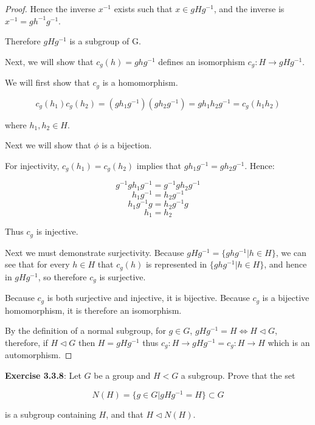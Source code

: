 \documentclass[a4paper]{article}
\begin{document}
\begin{myparindent}{0pt}
\begin{proof}
  Hence the inverse $x^{-1}$ exists such that $x \in gHg^{-1}$, and the inverse
  is $x^{-1} = gh^{-1}g^{-1}$.

  Therefore $gHg^{-1}$ is a subgroup of G. \newline

  Next, we will show that $c_g(h) = ghg^{-1}$ defines an isomorphism $c_g: H \rightarrow gHg^{-1}$. \newline

  We will first show that $c_g$ is a homomorphism.

  \[ c_g(h_1) c_g(h_2) = (g h_1 g^{-1})(g h_2 g^{-1}) = g h_1 h_2 g^{-1} = c_g(h_1 h_2) \]

  where $h_1, h_2 \in H$. \newline

  Next we will show that $\phi$ is a bijection.

  For injectivity, $c_g(h_1) = c_g(h_2)$ implies that $gh_1g^{-1} = gh_2g^{-1}$.
  Hence:

  \[ g^{-1}gh_1g^{-1} = g^{-1}gh_2g^{-1} \]
  \[ h_1g^{-1} = h_2g^{-1} \]
  \[ h_1g^{-1}g = h_2g^{-1}g \]
  \[ h_1 = h_2 \]

  Thus $c_g$ is injective. \newline

  Next we must demonstrate surjectivity. Because $gHg^{-1} = \{ ghg^{-1} | h \in H \}$,
  we can see that for every $h \in H$ that $c_g(h)$ is represented in $\{ ghg^{-1} | h \in H \}$,
  and hence in $gHg^{-1}$, so therefore $c_g$ is surjective. \newline

  Because $c_g$ is both surjective and injective, it is bijective. Because $c_g$
  is a bijective homomorphism, it is therefore an isomorphism. \newline

  By the definition of a normal subgroup, for $g \in G$, $gHg^{-1} = H \iff H \triangleleft G$,
  therefore, if $H \triangleleft G$ then $H = gHg^{-1}$ thus
  $c_g: H \rightarrow gHg^{-1} = c_g: H \rightarrow H$ which is an automorphism.

\end{proof}

\textbf{Exercise 3.3.8}:
Let $G$ be a group and $H < G$ a subgroup. Prove that the set

\[ N(H) = \{g \in G | gHg^{-1} = H \} \subset G \]
\newline

is a subgroup containing $H$, and that $H \triangleleft N(H)$.


\end{myparindent}
\end{document}
